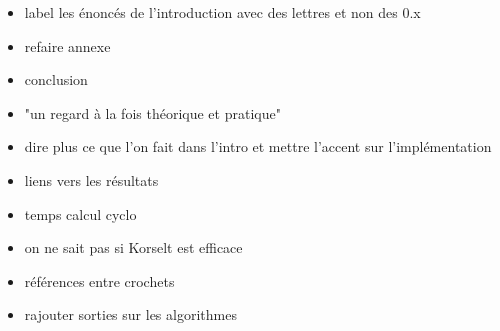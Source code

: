\begin{itemize}
	\item label les énoncés de l'introduction avec des lettres et non des 0.x
	\item refaire annexe
	\item conclusion
	\item "un regard à la fois théorique et pratique"
	\item dire plus ce que l'on fait dans l'intro et mettre l'accent sur l'implémentation
	\item liens vers les résultats

	\item temps calcul cyclo
	\item on ne sait pas si Korselt est efficace
	\item références entre crochets
	\item rajouter sorties sur les algorithmes
\end{itemize}
